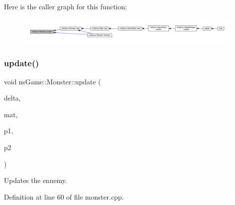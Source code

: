 Here is the caller graph for this function\+:\nopagebreak
\begin{figure}[H]
\begin{center}
\leavevmode
\includegraphics[width=350pt]{classns_game_1_1_monster_a6ee4a9d2cea5d327379de3416a059169_icgraph}
\end{center}
\end{figure}
\mbox{\label{classns_game_1_1_monster_a0fa9eca417938bdbf9f12befd4531b34}} 
\subsubsection{\texorpdfstring{update()}{update()}}
{\footnotesize\ttfamily void ns\+Game\+::\+Monster\+::update (\begin{DoxyParamCaption}\item[{unsigned}]{delta,  }\item[{\hyperlink{type_8h_a64a592133575ccebb1b36453acbec02b}{C\+Mat} \&}]{mat,  }\item[{\hyperlink{classns_game_1_1_player}{Player} $\ast$}]{p1,  }\item[{\hyperlink{classns_game_1_1_player}{Player} $\ast$}]{p2 }\end{DoxyParamCaption})}



Updates the ennemy. 



Definition at line 60 of file monster.\+cpp.

